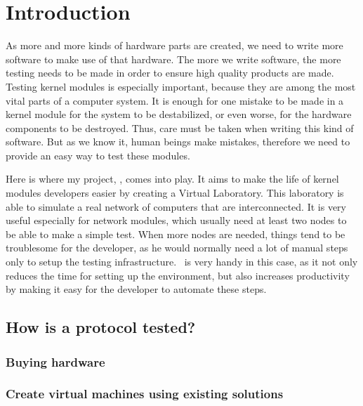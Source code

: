\chapter{Introduction}
\label{chapter:intro}

As more and more kinds of hardware parts are created, we need to write more software to make use of that hardware.
The more we write software, the more testing needs to be made in order to ensure high quality products are made.
Testing kernel modules is especially important, because they are among the most vital parts of a computer system.
It is enough for one mistake to be made in a kernel module for the system to be
destabilized, or even worse, for the hardware components to be destroyed.
Thus, care must be taken when writing this kind of software.
But as we know it, human beings make mistakes, therefore we need to provide an easy way to test these modules.

Here is where my project, \project, comes into play.
It aims to make the life of kernel modules developers easier by creating a Virtual Laboratory.
This laboratory is able to simulate a real network of computers that are interconnected.
It is very useful especially for network modules, which usually need at least two nodes to be able to make a simple test.
When more nodes are needed, things tend to be troublesome for the developer, as he would normally need a lot of manual steps only to setup the testing infrastructure.
\project\ is very handy in this case, as it not only reduces the time for setting up the environment, but also increases productivity by making it easy for the developer to automate these steps.

\section{How is a protocol tested?}
\label{sec:proto-testing}


\subsection{Buying hardware}
\label{sub-sec:proto-testing-hardware}


\subsection{Create virtual machines using existing solutions}
\label{sub-sec:proto-testing-vms}


